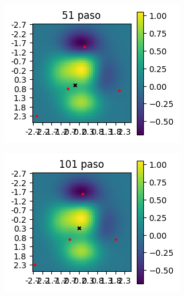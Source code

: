 \documentclass{article}
\begin{document}
\begin{figure}
     \centering
     \begin{subfigure}[b]{0.40\textwidth}
         \centering
         \includegraphics[width=\textwidth]{p7p_50.png}
         \caption{}
         \label{fig:notocan}
     \end{subfigure}
     \begin{subfigure}[b]{0.40\textwidth}
         \centering
         \includegraphics[width=\textwidth]{p7p_100.png}
         \caption{}
         \label{fig:tocan}
     \end{subfigure}
     \begin{subfigure}[b]{0.40\textwidth}

\end{subfigure}
\end{figure}
\end{document}

